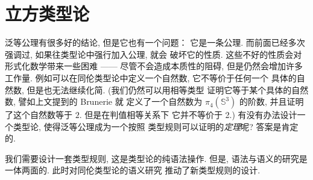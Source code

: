 \begin{comment}
以上就定义了群胚范畴上配备的函子
\(\mathrm{Tp}, \mathrm{Tm} : \mathsf{Grpd}\op \to \mathsf{Set}\)
在对象上的映射, 我们还需要给出它们在态射上的作用.
考虑群胚的同态 \(\sigma : \Delta \to \Gamma\),
由于 \(\mathrm{Tp}(\Gamma)\) 就是 \(\Gamma\) 上的
全体群胚族 \(\Gamma \to \mathsf{Grpd}\), 因此与 \(\sigma\)
复合就得到
\[(-\circ\sigma) : \mathrm{Tp}(\Gamma) \to \mathrm{Tp}(\Delta).\]
而 \(\mathrm{Tm}(\Gamma) \to \mathrm{Tm}(\Delta)\)
的态射也由复合给出. 不难验证这使得 \(\pi\) 构成预层之间的自然变换.

对于 \(\Gamma\) 与 \(G_\bullet \in \cons{Ty}(\Gamma)\),
我们最后还需要找到一个对象 \(\Gamma'\) 与态射
\(p : \Gamma' \to \Gamma\) 使得
\(\hom(-, \Gamma')\) 自然同构于
\(\yo(\Gamma) \times_{\mathrm{Tp}} \mathrm{Tm}\).
只需要取 \(\Gamma'\) 为 \({\int}G_\bullet\) 即可.
请读者验证满足条件.
证明群胚范畴上具备 \(\Pi,\Sigma\)-类型的结构与在
集合范畴上的证明基本相同. 更详细的构造相信读者可以
自己写出, 也可以参阅~\cite{hofmann:1998:groupoid}.

\subsection{相等类型}

\subsection{无穷群胚} \berryinf
\end{comment}

\section[立方类型论]{立方类型论\protect{}}

泛等公理有很多好的结论, 但是它也有一个问题： 它是一条公理.
而前面已经多次强调过, 如果往类型论中强行加入公理, 就会
破坏它的性质. 这些不好的性质会对形式化数学带来一些困难
------ 尽管不会造成本质性的阻碍, 但是仍然会增加许多工作量.
例如可以在同伦类型论中定义一个自然数, 它不等价于任何一个
具体的自然数, 但是也无法继续化简. (我们仍然可以用相等类型
证明它等于某个具体的自然数, 譬如上文提到的 Brunerie 就
定义了一个自然数为 \(\pi_4(\mathbb S^3)\) 的阶数,
并且证明了这个自然数等于 \(2\). 但是在判值相等关系下
它并不等价于 2.)
有没有办法设计一个类型论, 使得泛等公理成为一个按照
类型规则可以证明的\emph{定理}呢? 答案是肯定的.

我们需要设计一套类型规则, 这是类型论的纯语法操作. 但是,
语法与语义的研究是一体两面的. 此时对同伦类型论的语义研究
推动了新类型规则的设计.

